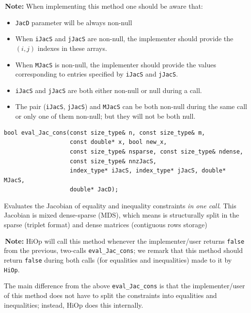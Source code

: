 \documentclass[11pt]{article}
\newcommand{\warningSymbol}{\raisebox{0.9\depth}{\danger}}
\newcommand{\warningcp}[1]{%
        \smallskip \noindent \textcolor{warningColorText}{\warningSymbol{}}\,\textbf{#1} %
    }
\newcommand{\Hi}{\texttt{HiOp}\xspace}
\begin{document}
\warningcp{Note:} When implementing this method one should be aware that:
\begin{itemize}
\item[1.] \texttt{JacD} parameter will be always non-null
\item[2.] When \texttt{iJacS} and \texttt{jJacS} are non-null, the implementer should provide the $(i,j)$   indexes in these arrays. 
\item[3.] When \texttt{MJacS} is non-null, the implementer should provide the values corresponding to    entries specified by \texttt{iJacS} and \texttt{jJacS}.
\item[4.] \texttt{iJacS} and \texttt{jJacS} are both either non-null or null during a call.
\item[5.] The pair (\texttt{iJacS}, \texttt{jJacS}) and \texttt{MJacS} can be both non-null during the same call or only one of them  non-null; but they will not be both null.
\end{itemize}


\begin{lstlisting}
bool eval_Jac_cons(const size_type& n, const size_type& m, 
                   const double* x, bool new_x,
                   const size_type& nsparse, const size_type& ndense,
                   const size_type& nnzJacS,
                   index_type* iJacS, index_type* jJacS, double* MJacS,
                   double* JacD);
\end{lstlisting} 

\noindent Evaluates the Jacobian of equality and inequality constraints \textit{in one call}. This Jacobian is mixed dense-sparse (MDS), which means is structurally split in the sparse (triplet format) and dense matrices (contiguous rows storage)
   
\warningcp{Note:}   HiOp will call this method whenever the implementer/user returns \texttt{false} from the previous, two-calls \texttt{eval\_Jac\_cons}; we remark that this method should return  \texttt{false} during both calls (for equalities and inequalities) made to it by \Hi.
   
   
   
The main difference from the above \texttt{eval\_Jac\_cons} is that the implementer/user of this 
    method does not have to split the constraints into equalities and inequalities; instead,
    HiOp does this internally.
   
\end{document}
